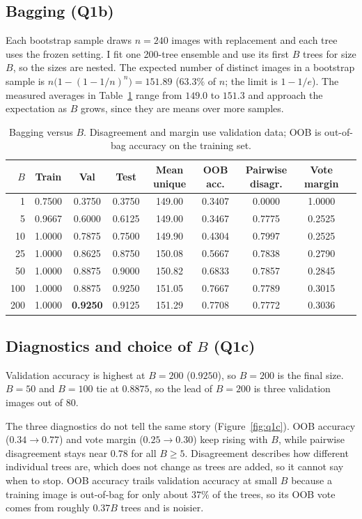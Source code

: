 \documentclass[10pt,twocolumn,letterpaper]{article}
\begin{document}
\subsection{Bagging (Q1b)}
Each bootstrap sample draws $n=240$ images with replacement and each tree uses the frozen setting.
I fit one 200-tree ensemble and use its first $B$ trees for size $B$, so the sizes are nested.
The expected number of distinct images in a bootstrap sample is $n\bigl(1-(1-1/n)^n\bigr)=151.89$ ($63.3\%$ of $n$; the limit is $1-1/e$).
The measured averages in Table~\ref{tab:q1b} range from $149.0$ to $151.3$ and approach the expectation as $B$ grows,
since they are means over more samples.

\begin{table}[t]
\centering
\caption{Bagging versus $B$. Disagreement and margin use validation data; OOB is out-of-bag accuracy on the training set.}
\label{tab:q1b}
\small
\setlength{\tabcolsep}{7pt}
\begin{tabular}{rcccccccc}
\toprule
$B$ & Train & Val & Test & Mean unique & OOB acc. & Pairwise disagr. & Vote margin \\
\midrule
1   & 0.7500 & 0.3750 & 0.3750 & 149.00 & 0.3407 & 0.0000 & 1.0000 \\
5   & 0.9667 & 0.6000 & 0.6125 & 149.00 & 0.3467 & 0.7775 & 0.2525 \\
10  & 1.0000 & 0.7875 & 0.7500 & 149.90 & 0.4304 & 0.7997 & 0.2525 \\
25  & 1.0000 & 0.8625 & 0.8750 & 150.08 & 0.5667 & 0.7838 & 0.2790 \\
50  & 1.0000 & 0.8875 & 0.9000 & 150.82 & 0.6833 & 0.7857 & 0.2845 \\
100 & 1.0000 & 0.8875 & 0.9250 & 151.05 & 0.7667 & 0.7789 & 0.3015 \\
200 & 1.0000 & \textbf{0.9250} & 0.9125 & 151.29 & 0.7708 & 0.7772 & 0.3036 \\
\bottomrule
\end{tabular}
\end{table}

\subsection{Diagnostics and choice of $B$ (Q1c)}
Validation accuracy is highest at $B=200$ ($0.9250$), so $B=200$ is the final size. $B=50$ and $B=100$ tie at $0.8875$,
so the lead of $B=200$ is three validation images out of 80.

The three diagnostics do not tell the same story (Figure~\ref{fig:q1c}).
OOB accuracy ($0.34\to0.77$) and vote margin ($0.25\to0.30$) keep rising with $B$, while
pairwise disagreement stays near $0.78$ for all $B\ge5$. Disagreement describes how different individual trees are,
which does not change as trees are added, so it cannot say when to stop.
OOB accuracy trails validation accuracy at small $B$ because a training image is out-of-bag for only about $37\%$ of the trees,
so its OOB vote comes from roughly $0.37B$ trees and is noisier.
\end{document}
